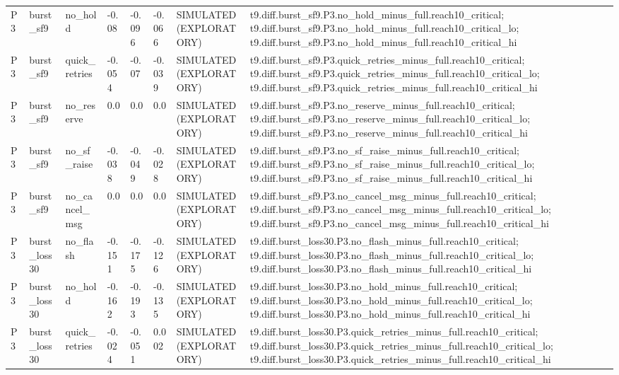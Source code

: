 \begin{table}[t]
\begin{tabular}{llllllll}
P3 & burst\_sf9 & no\_hold & -0.08 & -0.096 & -0.066 & SIMULATED (EXPLORATORY) & t9.diff.burst\_sf9.P3.no\_hold\_minus\_full.reach10\_critical; t9.diff.burst\_sf9.P3.no\_hold\_minus\_full.reach10\_critical\_lo; t9.diff.burst\_sf9.P3.no\_hold\_minus\_full.reach10\_critical\_hi \\
P3 & burst\_sf9 & quick\_retries & -0.054 & -0.07 & -0.039 & SIMULATED (EXPLORATORY) & t9.diff.burst\_sf9.P3.quick\_retries\_minus\_full.reach10\_critical; t9.diff.burst\_sf9.P3.quick\_retries\_minus\_full.reach10\_critical\_lo; t9.diff.burst\_sf9.P3.quick\_retries\_minus\_full.reach10\_critical\_hi \\
P3 & burst\_sf9 & no\_reserve & 0.0 & 0.0 & 0.0 & SIMULATED (EXPLORATORY) & t9.diff.burst\_sf9.P3.no\_reserve\_minus\_full.reach10\_critical; t9.diff.burst\_sf9.P3.no\_reserve\_minus\_full.reach10\_critical\_lo; t9.diff.burst\_sf9.P3.no\_reserve\_minus\_full.reach10\_critical\_hi \\
P3 & burst\_sf9 & no\_sf\_raise & -0.038 & -0.049 & -0.028 & SIMULATED (EXPLORATORY) & t9.diff.burst\_sf9.P3.no\_sf\_raise\_minus\_full.reach10\_critical; t9.diff.burst\_sf9.P3.no\_sf\_raise\_minus\_full.reach10\_critical\_lo; t9.diff.burst\_sf9.P3.no\_sf\_raise\_minus\_full.reach10\_critical\_hi \\
P3 & burst\_sf9 & no\_cancel\_msg & 0.0 & 0.0 & 0.0 & SIMULATED (EXPLORATORY) & t9.diff.burst\_sf9.P3.no\_cancel\_msg\_minus\_full.reach10\_critical; t9.diff.burst\_sf9.P3.no\_cancel\_msg\_minus\_full.reach10\_critical\_lo; t9.diff.burst\_sf9.P3.no\_cancel\_msg\_minus\_full.reach10\_critical\_hi \\
P3 & burst\_loss30 & no\_flash & -0.151 & -0.175 & -0.126 & SIMULATED (EXPLORATORY) & t9.diff.burst\_loss30.P3.no\_flash\_minus\_full.reach10\_critical; t9.diff.burst\_loss30.P3.no\_flash\_minus\_full.reach10\_critical\_lo; t9.diff.burst\_loss30.P3.no\_flash\_minus\_full.reach10\_critical\_hi \\
P3 & burst\_loss30 & no\_hold & -0.162 & -0.193 & -0.135 & SIMULATED (EXPLORATORY) & t9.diff.burst\_loss30.P3.no\_hold\_minus\_full.reach10\_critical; t9.diff.burst\_loss30.P3.no\_hold\_minus\_full.reach10\_critical\_lo; t9.diff.burst\_loss30.P3.no\_hold\_minus\_full.reach10\_critical\_hi \\
P3 & burst\_loss30 & quick\_retries & -0.024 & -0.051 & 0.002 & SIMULATED (EXPLORATORY) & t9.diff.burst\_loss30.P3.quick\_retries\_minus\_full.reach10\_critical; t9.diff.burst\_loss30.P3.quick\_retries\_minus\_full.reach10\_critical\_lo; t9.diff.burst\_loss30.P3.quick\_retries\_minus\_full.reach10\_critical\_hi \\

\end{tabular}
\end{table}

